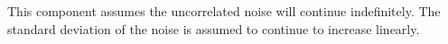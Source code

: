 This component assumes the uncorrelated noise will continue indefinitely.
The standard deviation of the noise is assumed to continue to increase linearly.
